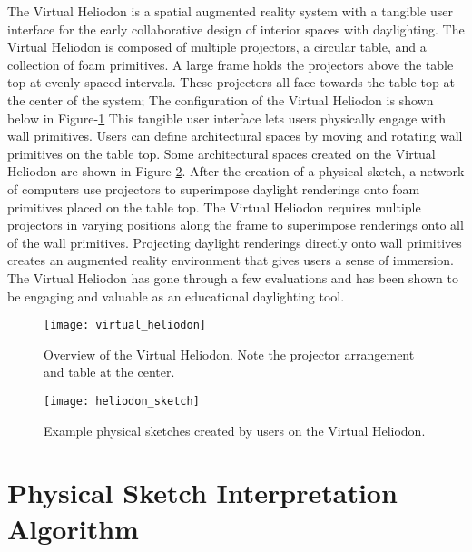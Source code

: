 	The Virtual Heliodon is a spatial augmented reality system with a tangible user interface for the early collaborative design of interior spaces with daylighting\cite{sheng2009virtual, cutler2009inferring,nasman2013physical,cutler2010interpreting}. 
	The Virtual Heliodon is composed of multiple projectors, a circular table, and a collection of foam primitives.  
	A large frame holds the projectors above the table top at evenly spaced intervals. 
	These projectors all face towards the table top at the center of the system;
	The configuration of the Virtual Heliodon is shown below in Figure-\ref{fig:virtual_heliodon}
	This tangible user interface lets users physically engage with wall primitives. 
	Users can define architectural spaces by moving and rotating wall primitives on the table top.
	Some architectural spaces created on the Virtual Heliodon are shown in Figure-\ref{fig:heliodon_sketch}.
	After the creation of a physical sketch, a network of computers use projectors to superimpose daylight renderings onto foam primitives placed on the table top.
	The Virtual Heliodon requires multiple projectors in varying positions along the frame to superimpose renderings onto all of the wall primitives.
	Projecting daylight renderings directly onto wall primitives creates an augmented reality environment that gives users a sense of immersion\cite{nasman2013physical}.
	The Virtual Heliodon has gone through a few evaluations and has been shown to be engaging and valuable as an educational daylighting tool\cite{nasman2013physical}.

	\begin{figure}[h]
	\centering
	\caption[Overiew of the Virtual Heliodon.]{Overview of the Virtual Heliodon. Note the projector arrangement and table at the center.}
	\label{fig:virtual_heliodon}
	\texttt{[image: virtual\_heliodon]}
	\end{figure}

	\begin{figure}[h]
	\centering
	\caption{Example physical sketches created by users on the Virtual Heliodon.}
	\label{fig:heliodon_sketch}
	\texttt{[image: heliodon\_sketch]}
	\end{figure}

\section{Physical Sketch Interpretation Algorithm}

